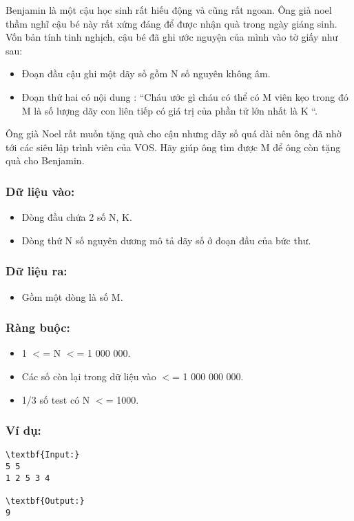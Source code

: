 

Benjamin là một cậu học sinh rất hiếu động và cũng rất ngoan. Ông già noel thầm nghĩ cậu bé này rất xứng đáng để được nhận quà trong ngày giáng sinh. Vốn bản tính tinh nghịch, cậu bé đã ghi ước nguyện của mình vào tờ giấy như sau:
\begin{itemize}
	\item Đoạn đầu cậu ghi một dãy số gồm N số nguyên không âm.
	\item Đoạn thứ hai có nội dung : “Cháu ước gì cháu có thể có M viên kẹo trong đó M là số lượng dãy con liên tiếp có giá trị của phần tử lớn nhất là K “.
\end{itemize}

Ông già Noel rất muốn tặng quà cho cậu nhưng dãy số quá dài nên ông đã nhờ tới các siêu lập trình viên của VOS. Hãy giúp ông tìm được M để ông còn tặng quà cho Benjamin.

\subsubsection{\textbf{Dữ liệu vào: }}
\begin{itemize}
	\item Dòng đầu chứa 2 số N, K.
	\item Dòng thứ N số nguyên dương mô tả dãy số ở đoạn đầu của bức thư.
\end{itemize}

\subsubsection{\textbf{Dữ liệu ra: }}
\begin{itemize}
	\item Gồm một dòng là số M.
\end{itemize}

\subsubsection{\textbf{Ràng buộc: }}
\begin{itemize}
	\item 1 $<$= N $<$= 1 000 000.
	\item Các số còn lại trong dữ liệu vào $<$= 1 000 000 000.
	\item 1/3 số test có N $<$= 1000.
\end{itemize}

\subsubsection{\textbf{Ví dụ: }}
\begin{verbatim}
\textbf{Input:}
5 5
1 2 5 3 4

\textbf{Output:}
9

\end{verbatim}